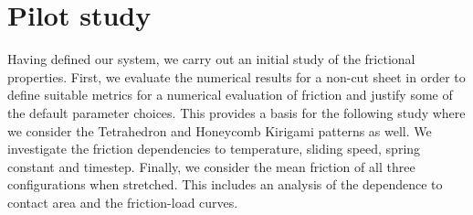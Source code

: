 
\chapter{Pilot study}\label{chap:pilot_study}

Having defined our system, we carry out an initial study of the frictional properties. First, we evaluate the numerical results for a non-cut sheet in order to define suitable metrics for a numerical evaluation of friction and justify some of the default parameter choices. This provides a basis for the following study where we consider the Tetrahedron and Honeycomb Kirigami patterns as well. We investigate the friction dependencies to temperature, sliding speed, spring constant and timestep. Finally, we consider the mean friction of all three configurations when stretched. This includes an analysis of the dependence to contact area and the friction-load curves. 




